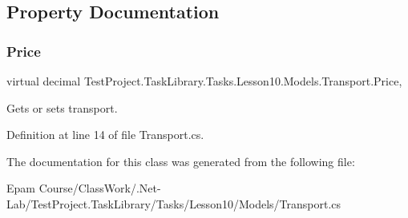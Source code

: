 \subsection{Property Documentation}
\mbox{\label{class_test_project_1_1_task_library_1_1_tasks_1_1_lesson10_1_1_models_1_1_transport_acd90158ed26c0010d5a895d20223e20f}} 
\subsubsection{\texorpdfstring{Price}{Price}}
{\footnotesize\ttfamily virtual decimal Test\+Project.\+Task\+Library.\+Tasks.\+Lesson10.\+Models.\+Transport.\+Price\hspace{0.3cm}{\ttfamily [get]}, {\ttfamily [set]}}



Gets or sets transport. 



Definition at line 14 of file Transport.\+cs.



The documentation for this class was generated from the following file\+:\begin{DoxyCompactItemize}
\item 
Epam Course/\+Class\+Work/.\+Net-\/\+Lab/\+Test\+Project.\+Task\+Library/\+Tasks/\+Lesson10/\+Models/Transport.\+cs\end{DoxyCompactItemize}
